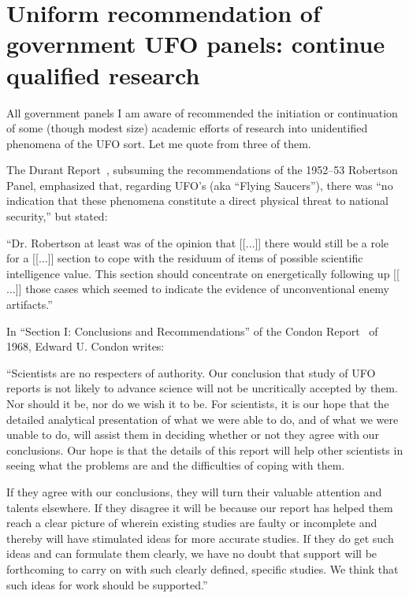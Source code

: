 \section{Uniform recommendation of government UFO panels: continue qualified research}

All government panels I am aware of recommended the initiation or continuation of some
(though modest size) academic efforts of research into unidentified phenomena of the UFO sort.
Let me quote from three of them.

The Durant Report~\cite{RobertsonPanelDurantReport}, subsuming the recommendations of the 1952--53 Robertson Panel,
emphasized that, regarding UFO's (aka ``Flying Saucers''),  there was ``no indication that these phenomena constitute a direct physical threat to national security,''
but stated:
\begin{svgraybox}
``Dr. Robertson at least was of the opinion that [[$\ldots$]] there would still be a role for a [[$\ldots$]] section
to cope with the residuum of items of possible scientific intelligence value.
This section should concentrate on energetically following up [[$\ldots$]]
those cases which seemed to indicate the evidence of unconventional enemy artifacts.''
\end{svgraybox}




In  ``Section I: Conclusions and Recommendations'' of the Condon Report~\cite{Condon-report,Condon-report-Bantam,Condon-report-Dutton,BibEntry2023Jan} of 1968,
Edward U. Condon writes:
\begin{svgraybox}
``Scientists are no respecters of authority. Our conclusion that study of UFO reports is not likely to advance science will not be
uncritically accepted by them. Nor should it be, nor do we wish it to be. For scientists, it is our hope that the detailed analytical
presentation of what we were able to do, and of what we were unable to do, will assist them in deciding whether or not they agree with
our conclusions. Our hope is that the details of this report will help other scientists in seeing what the problems are and the difficulties
of coping with them.

If they agree with our conclusions, they will turn their valuable attention and talents elsewhere. If they disagree it will be because
our report has helped them reach a clear picture of wherein existing studies are faulty or incomplete and thereby will have stimulated
ideas for more accurate studies. If they do get such ideas and can formulate them clearly, we have no doubt that support will be
forthcoming to carry on with such clearly defined, specific studies. We think that such ideas for work should be supported.''
\end{svgraybox}


